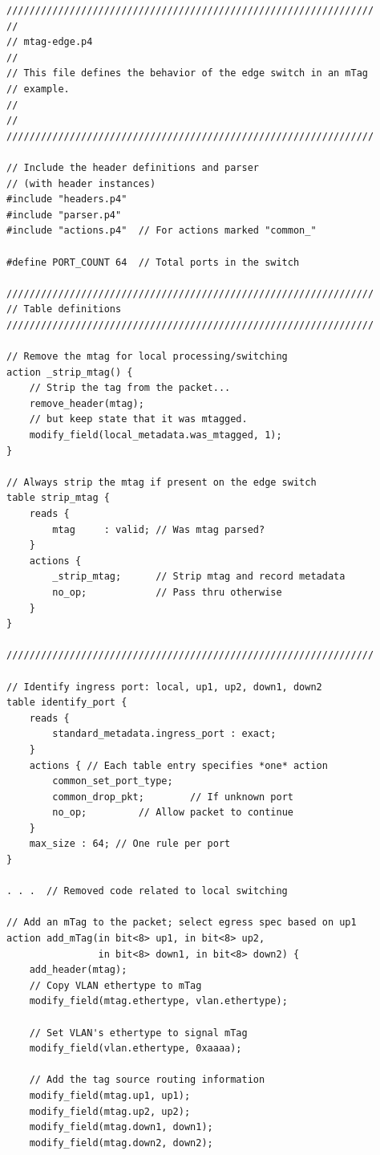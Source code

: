 \documentclass[12pt]{article}
\begin{document}
\begin{lstlisting}[style=P4style]
////////////////////////////////////////////////////////////////
//
// mtag-edge.p4
//
// This file defines the behavior of the edge switch in an mTag
// example.
//
//
////////////////////////////////////////////////////////////////

// Include the header definitions and parser
// (with header instances)
#include "headers.p4"
#include "parser.p4"
#include "actions.p4"  // For actions marked "common_"

#define PORT_COUNT 64  // Total ports in the switch

////////////////////////////////////////////////////////////////
// Table definitions
////////////////////////////////////////////////////////////////

// Remove the mtag for local processing/switching
action _strip_mtag() {
    // Strip the tag from the packet...
    remove_header(mtag);
    // but keep state that it was mtagged.
    modify_field(local_metadata.was_mtagged, 1);
}

// Always strip the mtag if present on the edge switch
table strip_mtag {
    reads {
        mtag     : valid; // Was mtag parsed?
    }
    actions {
        _strip_mtag;      // Strip mtag and record metadata
        no_op;            // Pass thru otherwise
    }
}

////////////////////////////////////////////////////////////////

// Identify ingress port: local, up1, up2, down1, down2
table identify_port {
    reads {
        standard_metadata.ingress_port : exact;
    }
    actions { // Each table entry specifies *one* action
        common_set_port_type;
        common_drop_pkt;        // If unknown port
        no_op;         // Allow packet to continue
    }
    max_size : 64; // One rule per port
}

. . .  // Removed code related to local switching

// Add an mTag to the packet; select egress spec based on up1
action add_mTag(in bit<8> up1, in bit<8> up2, 
                in bit<8> down1, in bit<8> down2) {
    add_header(mtag);
    // Copy VLAN ethertype to mTag
    modify_field(mtag.ethertype, vlan.ethertype);

    // Set VLAN's ethertype to signal mTag
    modify_field(vlan.ethertype, 0xaaaa);

    // Add the tag source routing information
    modify_field(mtag.up1, up1);
    modify_field(mtag.up2, up2);
    modify_field(mtag.down1, down1);
    modify_field(mtag.down2, down2);


\end{lstlisting}
\end{document}
